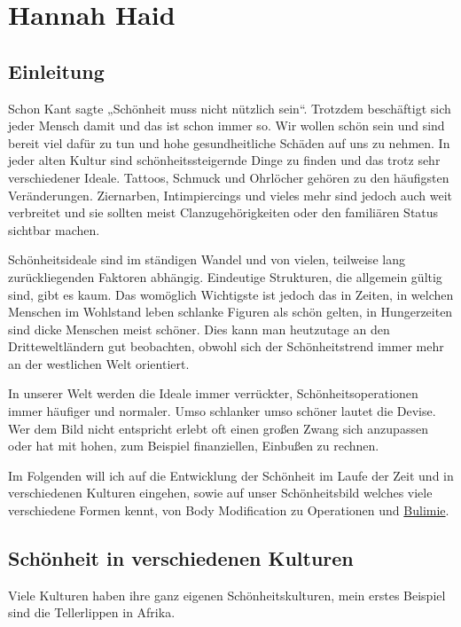 \chapter{Hannah Haid}
\label{sec:Hannah_Haid}

\section{Einleitung}
Schon Kant sagte „Schönheit muss nicht nützlich sein“. Trotzdem beschäftigt sich jeder Mensch damit
und das ist schon immer so. Wir wollen schön sein und sind bereit viel dafür zu tun und hohe
gesundheitliche Schäden auf uns zu nehmen. In jeder alten Kultur sind schönheitssteigernde Dinge zu
finden und das trotz sehr verschiedener Ideale. Tattoos, Schmuck und Ohrlöcher gehören zu den
häufigsten Veränderungen. Ziernarben, Intimpiercings und vieles mehr sind jedoch auch weit
verbreitet und
sie sollten meist Clanzugehörigkeiten oder den familiären Status
sichtbar machen.

Schönheitsideale sind im ständigen Wandel und von vielen, teilweise lang zurückliegenden
Faktoren abhängig. Eindeutige Strukturen, die allgemein gültig sind, gibt es kaum. Das
womöglich
Wichtigste ist jedoch das in Zeiten, in welchen Menschen im Wohlstand leben schlanke Figuren als
schön
gelten, in Hungerzeiten sind dicke Menschen meist schöner. Dies kann man heutzutage an den
Dritteweltländern gut beobachten, obwohl sich der Schönheitstrend immer mehr an der westlichen Welt
orientiert.

In unserer Welt werden die Ideale immer verrückter, Schönheitsoperationen immer häufiger und
normaler. Umso schlanker umso schöner lautet die Devise. Wer dem Bild nicht entspricht erlebt oft
einen großen Zwang sich anzupassen oder hat mit hohen, zum Beispiel finanziellen, Einbußen zu
rechnen.

Im Folgenden will ich auf die Entwicklung der Schönheit im Laufe der Zeit und in verschiedenen
Kulturen
eingehen, sowie auf unser Schönheitsbild welches viele verschiedene Formen kennt, von Body
Modification zu Operationen und \href{http://de.wikipedia.org/wiki/Bulimie}{Bulimie}.

\clearpage
\section{Schönheit in verschiedenen Kulturen}
Viele Kulturen haben ihre ganz eigenen Schönheitskulturen, mein erstes Beispiel sind die
Tellerlippen in Afrika.

